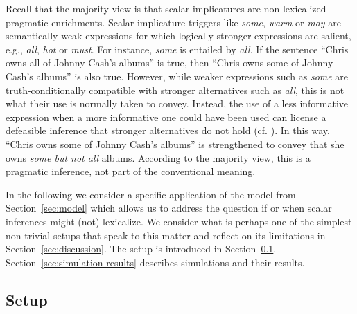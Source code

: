\documentclass[a4paper, 11pt]{article}
\theoremstyle{Satz}
\begin{document}
Recall that the majority view is that scalar implicatures are non-lexicalized pragmatic
enrichments. Scalar implicature triggers like \emph{some}, \emph{warm} or \emph{may} are
semantically weak expressions for which logically stronger expressions are salient, e.g.,
\emph{all}, \emph{hot} or \emph{must}. For instance, {\em some} is entailed by {\em all}. If
the sentence ``Chris owns all of Johnny Cash's albums'' is true, then ``Chris owns some of
Johnny Cash's albums'' is also true. However, while weaker expressions such as {\em some} are
truth-conditionally compatible with stronger alternatives such as {\em all}, this is not what
their use is normally taken to convey. Instead, the use of a less informative expression when a
more informative one could have been used can license a defeasible inference that stronger
alternatives do not hold (cf. \citealt{horn:1972,gazdar:1979}). In this way, ``Chris owns some
of Johnny Cash's albums'' is strengthened to convey that she owns {\em some but not all}
albums. According to the majority view, this is a pragmatic inference, not part of the
conventional meaning.

In the following we consider a specific application of the model from Section~\ref{sec:model}
which allows us to address the question if or when scalar inferences might (not) lexicalize. We
consider what is perhaps one of the simplest non-trivial setups that speak to this matter and
reflect on its limitations in Section~\ref{sec:discussion}. The setup is introduced in
Section~\ref{sec:setup:-stat-conc}. Section~\ref{sec:simulation-results} describes simulations
and their results.


\subsection{Setup}
\label{sec:setup:-stat-conc}
\end{document}
